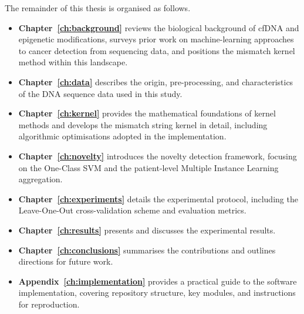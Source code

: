 The remainder of this thesis is organised as follows.

\begin{itemize}
    \item \textbf{Chapter~\ref{ch:background}} reviews the biological background
          of cfDNA and epigenetic modifications, surveys prior work on
          machine-learning approaches to cancer detection from sequencing data,
          and positions the mismatch kernel method within this landscape.
    \item \textbf{Chapter~\ref{ch:data}} describes the origin, pre-processing,
          and characteristics of the DNA sequence data used in this study.
    \item \textbf{Chapter~\ref{ch:kernel}} provides the mathematical foundations
          of kernel methods and develops the mismatch string kernel in detail,
          including algorithmic optimisations adopted in the implementation.
    \item \textbf{Chapter~\ref{ch:novelty}} introduces the novelty detection
          framework, focusing on the One-Class SVM and the patient-level
          Multiple Instance Learning aggregation.
    \item \textbf{Chapter~\ref{ch:experiments}} details the experimental
          protocol, including the Leave-One-Out cross-validation scheme and
          evaluation metrics.
    \item \textbf{Chapter~\ref{ch:results}} presents and discusses the
          experimental results.
    \item \textbf{Chapter~\ref{ch:conclusions}} summarises the contributions and
          outlines directions for future work.
    \item \textbf{Appendix~\ref{ch:implementation}} provides a practical guide
          to the software implementation, covering repository structure, key
          modules, and instructions for reproduction.
\end{itemize}